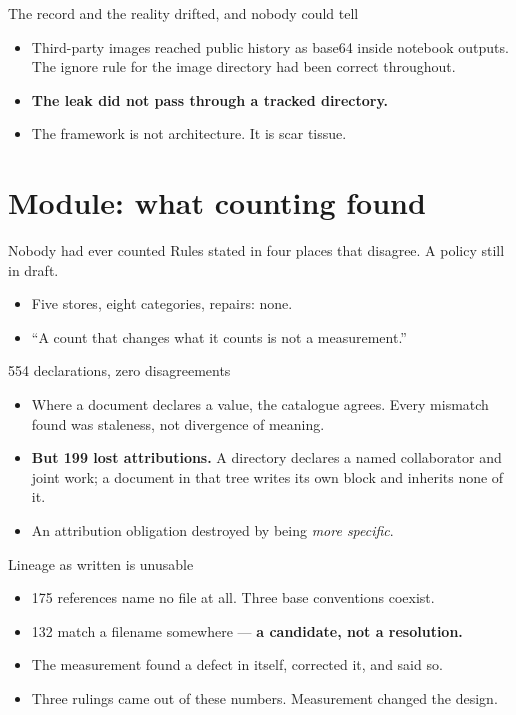\documentclass[aspectratio=169,t]{beamer}
\begin{document}
\begin{frame}{The record and the reality drifted, and nobody could tell}
    \begin{itemize}
        \item Third-party images reached public history as base64 inside notebook
              outputs. The ignore rule for the image directory had been correct
              throughout.
        \item \textbf{The leak did not pass through a tracked directory.}
        \item The framework is not architecture. It is scar tissue.
    \end{itemize}
\end{frame}

\section{Module: what counting found}

\begin{frame}{Nobody had ever counted}
    Rules stated in four places that disagree. A policy still in draft.
    \begin{itemize}
        \item Five stores, eight categories, repairs: none.
        \item ``A count that changes what it counts is not a measurement.''
    \end{itemize}
\end{frame}

\begin{frame}{554 declarations, zero disagreements}
    \begin{itemize}
        \item Where a document declares a value, the catalogue agrees. Every
              mismatch found was staleness, not divergence of meaning.
        \item \textbf{But 199 lost attributions.} A directory declares a named
              collaborator and joint work; a document in that tree writes its own
              block and inherits none of it.
        \item An attribution obligation destroyed by being \emph{more specific}.
    \end{itemize}
\end{frame}

\begin{frame}{Lineage as written is unusable}
    \begin{itemize}
        \item 175 references name no file at all. Three base conventions coexist.
        \item 132 match a filename somewhere --- \textbf{a candidate, not a resolution.}
        \item The measurement found a defect in itself, corrected it, and said so.
        \item Three rulings came out of these numbers. Measurement changed the design.
    \end{itemize}
\end{frame}
\end{document}
